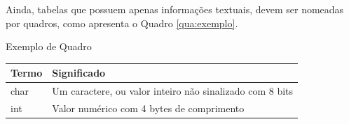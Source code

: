 \begin{apendicesenv}
    Ainda, tabelas que possuem apenas informações textuais, devem ser nomeadas por quadros, como apresenta o Quadro \ref{qua:exemplo}.
    
    \begin{quadro}[ht]
        \caption{Exemplo de Quadro}
        \begin{tabular}{ll}
            \toprule
            Termo & Significado \\
            \midrule
            char  & Um caractere, ou valor inteiro não sinalizado com 8 bits \\
            int   & Valor numérico com 4 bytes de comprimento \\
            \bottomrule
            \bottomrule
        \end{tabular}
        \label{qua:exemplo}
    \end{quadro}
    
\end{apendicesenv}